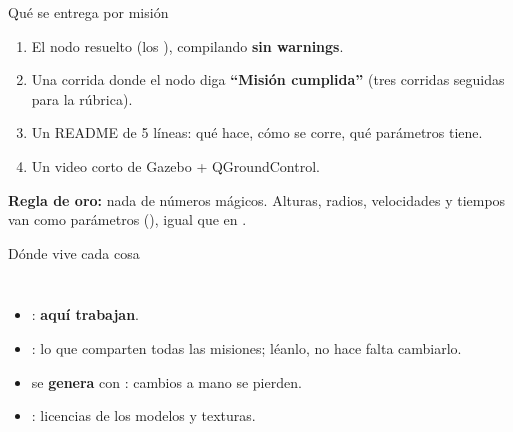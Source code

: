 \begin{frame}{Qué se entrega por misión}
  \begin{enumerate}
    \item El nodo resuelto (los ), compilando \textbf{sin warnings}.
    \item Una corrida donde el nodo diga \textbf{``Misión cumplida''} (tres corridas seguidas para la rúbrica).
    \item Un README de 5 líneas: qué hace, cómo se corre, qué parámetros tiene.
    \item Un video corto de Gazebo + QGroundControl.
  \end{enumerate}
  \vspace{0.5em}
  \begin{idea}
    \textbf{Regla de oro:} nada de números mágicos. Alturas, radios, velocidades y
    tiempos van como parámetros (), igual que en
    .
  \end{idea}
\end{frame}

\begin{frame}{Dónde vive cada cosa}
  \begin{columns}[c]
    \small
    \begin{itemize}
      \item {}: \textbf{aquí trabajan}.
      \item {}: lo que comparten todas las misiones; léanlo, no hace falta cambiarlo.
      \item {} se \textbf{genera} con : cambios a mano se pierden.
      \item {}: licencias de los modelos y texturas.
    \end{itemize}
  \end{columns}
\end{frame}

